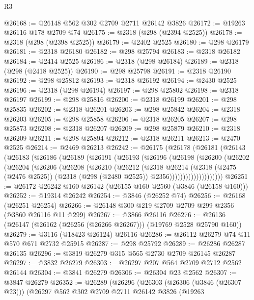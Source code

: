 \begin{lexlean}{R3}
\begin{coremodule}
@26168 := @26148 @562 @302 @2709 @2711 @26142 @3826
@26172 := @19263 @26116 @178 @2709 @74
@26175 := @2318 (@298 (@2394 @2525))
@26178 := @2318 (@298 (@2398 @2525))
@26179 := @2402 @2525
@26180 := @298 @26179
@26181 := @2318 @26180
@26182 := @298 @25794
@26183 := @2318 @26182
@26184 := @2414 @2525
@26186 := @2318 (@298 @26184)
@26189 := @2318 (@298 (@2418 @2525))
@26190 := @298 @25798
@26191 := @2318 @26190
@26192 := @298 @25812
@26193 := @2318 @26192
@26194 := @2430 @2525
@26196 := @2318 (@298 @26194)
@26197 := @298 @25802
@26198 := @2318 @26197
@26199 := @298 @25816
@26200 := @2318 @26199
@26201 := @298 @25835
@26202 := @2318 @26201
@26203 := @298 @25842
@26204 := @2318 @26203
@26205 := @298 @25858
@26206 := @2318 @26205
@26207 := @298 @25873
@26208 := @2318 @26207
@26209 := @298 @25879
@26210 := @2318 @26209
@26211 := @298 @25894
@26212 := @2318 @26211
@26213 := @2470 @2525
@26214 := @2469 @26213
@26242 := @26175
    (@26178
      (@26181
        (@26143
          (@26183
            (@26186
              (@26189
                (@26191
                  (@26193
                    (@26196
                      (@26198
                        (@26200
                          (@26202
                            (@26204
                              (@26206
                                (@26208
                                  (@26210
                                    (@26212
                                      (@2318
                                        @26214
                                        (@2318
                                          (@2475 (@2476 @2525))
                                          (@2318 (@298 (@2480 @2525)) @2356))))))))))))))))))))
@26251 := @26172 @26242 @160 @26142 (@26155 @160 @2560 (@3846 (@26158 @160)))
@26252 := @19314 @26242
@26254 := @3846 (@26252 @74)
@26256 := @26168 (@26251 @26254)
@26266 := @26148 @300 @219 @2709 @2709 @299 @2356 (@3860 @26116 @11 @299)
@26267 := @3866 @26116
@26276 := @26136 (@26147 (@26162 (@26256 (@26266 @26267))) (@19769 @2528 @25790 @160))
@26279 := @3116 (@18423 @26124) @26116
@26286 := @26112 @26279 @74 @11 @570 @671 @2732 @25915
@26287 := @298 @25792
@26289 := @26286 @26287 @26135
@26296 := @3819 @26279 @315 @565 @2730 @2709 @26145 @26287
@26297 := @3832 @26279
@26303 := @26297 @207 @564 @2709 @2712 @2562 @26144
@26304 := @3841 @26279
@26306 := @26304 @23 @2562
@26307 := @3847 @26279
@26352 := @26289
    (@26296
      (@26303
        (@26306 (@3846 (@26307 @23)))
        (@26297
          @562
          @302
          @2709
          @2711
          @26142
          @3826
          (@19263

\end{coremodule}
\end{lexlean}
